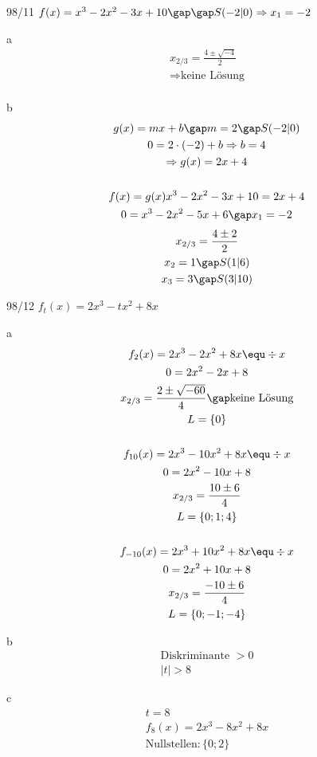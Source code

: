 \begin{exercise}{98/11}
  $f(x) = x^3 - 2x^2 - 3x + 10 \gap\gap S(-2|0) \Rightarrow x_1 = -2$
  \item [a]
  \begin{gather*}
    x_{2/3} = \frac{4 \pm \sqrt{-4}}{2} \\
    \Rightarrow \text{keine Lösung} \\
  \end{gather*}
  \item [b]
  \begin{gather*}
    g(x) = mx + b \gap m = 2 \gap S(-2|0) \\
    0 = 2 \cdot (-2) + b \Rightarrow b = 4 \\
    \Rightarrow g(x) = 2x + 4 \\\\
    f(x) = g(x)
    x^3 - 2x^2 - 3x + 10 = 2x + 4 \\
    0 = x^3 - 2x^2 - 5x + 6 \gap x_1 = -2
  \end{gather*}
  \begin{gather*}
    x_{2/3} = \frac{4 \pm 2}{2} \\
    x_2 = 1 \gap S(1|6) \\
    x_3 = 3 \gap S(3|10)
  \end{gather*}
\end{exercise}
\begin{exercise}{98/12}
  $f_t(x) = 2x^3 - tx^2 + 8x$
  \item [a]
  \begin{gather*}
    f_2(x) = 2x^3 - 2x^2 + 8x \equ \div x \\
    0 = 2x^2 - 2x + 8 \\
    x_{2/3} = \frac{2 \pm \sqrt{-60}}{4} \gap \text{keine Lösung} \\
    L = \{0\} \\\\
    f_{10}(x) = 2x^3 - 10x^2 + 8x \equ \div x \\
    0 = 2x^2 - 10x + 8 \\
    x_{2/3} = \frac{10 \pm 6}{4} \\
    L = \{0; 1; 4\} \\\\
    f_{-10}(x) = 2x^3 + 10x^2 + 8x \equ \div x \\
    0 = 2x^2 + 10x + 8 \\
    x_{2/3} = \frac{-10 \pm 6}{4} \\
    L = \{0; -1; -4\}
  \end{gather*}
  \item [b]
  \begin{gather*}
    \text{Diskriminante } > 0 \\
    |t| > 8
  \end{gather*}
  \item [c]
  \begin{gather*}
    t = 8 \\
    f_8(x) = 2x^3 - 8x^2 + 8x \\
    \text{Nullstellen} \colon \{0; 2\}
  \end{gather*}
\end{exercise}
